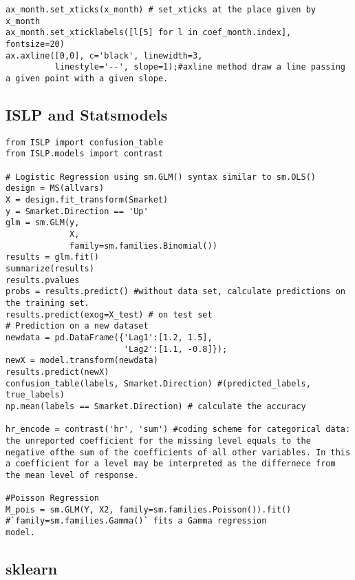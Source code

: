 \documentclass[
  letterpaper,
  DIV=11,
  numbers=noendperiod]{scrreprt}
\begin{document}
\begin{verbatim}
ax_month.set_xticks(x_month) # set_xticks at the place given by x_month
ax_month.set_xticklabels([l[5] for l in coef_month.index], fontsize=20)
ax.axline([0,0], c='black', linewidth=3,  
          linestyle='--', slope=1);#axline method draw a line passing a given point with a given slope. 
\end{verbatim}

\subsection{ISLP and Statsmodels}\label{islp-and-statsmodels}

\begin{verbatim}
from ISLP import confusion_table
from ISLP.models import contrast

# Logistic Regression using sm.GLM() syntax similar to sm.OLS()
design = MS(allvars)
X = design.fit_transform(Smarket)
y = Smarket.Direction == 'Up'
glm = sm.GLM(y,
             X,
             family=sm.families.Binomial())
results = glm.fit()
summarize(results)
results.pvalues
probs = results.predict() #without data set, calculate predictions on the training set. 
results.predict(exog=X_test) # on test set
# Prediction on a new dataset
newdata = pd.DataFrame({'Lag1':[1.2, 1.5],
                        'Lag2':[1.1, -0.8]});
newX = model.transform(newdata)
results.predict(newX)
confusion_table(labels, Smarket.Direction) #(predicted_labels, true_labels)
np.mean(labels == Smarket.Direction) # calculate the accuracy

hr_encode = contrast('hr', 'sum') #coding scheme for categorical data: the unreported coefficient for the missing level equals to the negative ofthe sum of the coefficients of all other variables. In this a coefficient for a level may be interpreted as the differnece from the mean level of response. 

#Poisson Regression 
M_pois = sm.GLM(Y, X2, family=sm.families.Poisson()).fit()
#`family=sm.families.Gamma()` fits a Gamma regression
model.
\end{verbatim}

\subsection{sklearn}\label{sklearn}
\end{document}
